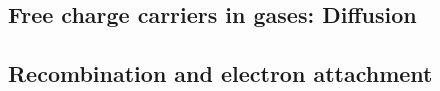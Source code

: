\documentclass{article}
\begin{document}
	\subsection{Free charge carriers in gases: Diffusion}
		
	\subsection{Recombination and electron attachment}
		
% 		
% 		
% 		
\end{document}
